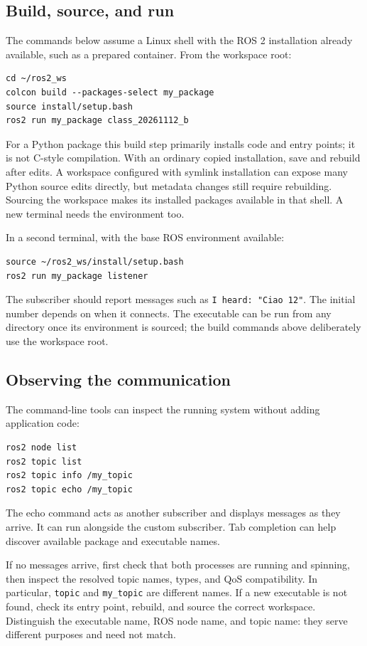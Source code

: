 \subsection{Build, source, and run}
The commands below assume a Linux shell with the ROS 2 installation already
available, such as a prepared container. From the workspace root:
\begin{lstlisting}[style=robotcode]
cd ~/ros2_ws
colcon build --packages-select my_package
source install/setup.bash
ros2 run my_package class_20261112_b
\end{lstlisting}
For a Python package this build step primarily installs code and entry
points; it is not C-style compilation. With an ordinary copied installation,
save and rebuild after edits. A workspace configured with symlink installation
can expose many Python source edits directly, but metadata changes still
require rebuilding. Sourcing the workspace makes its installed packages
available in that shell. A new terminal needs the environment too.

In a second terminal, with the base ROS environment available:
\begin{lstlisting}[style=robotcode]
source ~/ros2_ws/install/setup.bash
ros2 run my_package listener
\end{lstlisting}
The subscriber should report messages such as \texttt{I heard: "Ciao 12"}.
The initial number depends on when it connects. The executable can be run
from any directory once its environment is sourced; the build commands
above deliberately use the workspace root.

\subsection{Observing the communication}
The command-line tools can inspect the running system without adding
application code:
\begin{lstlisting}[style=robotcode]
ros2 node list
ros2 topic list
ros2 topic info /my_topic
ros2 topic echo /my_topic
\end{lstlisting}
The echo command acts as another subscriber and displays messages as they
arrive. It can run alongside the custom subscriber. Tab completion can
help discover available package and executable names.

If no messages arrive, first check that both processes are running and
spinning, then inspect the resolved topic names, types, and QoS compatibility.
In particular, \texttt{topic} and \texttt{my\_topic} are different names.
If a new executable is not found, check its entry point, rebuild, and
source the correct workspace. Distinguish the executable name, ROS node
name, and topic name: they serve different purposes and need not match.

